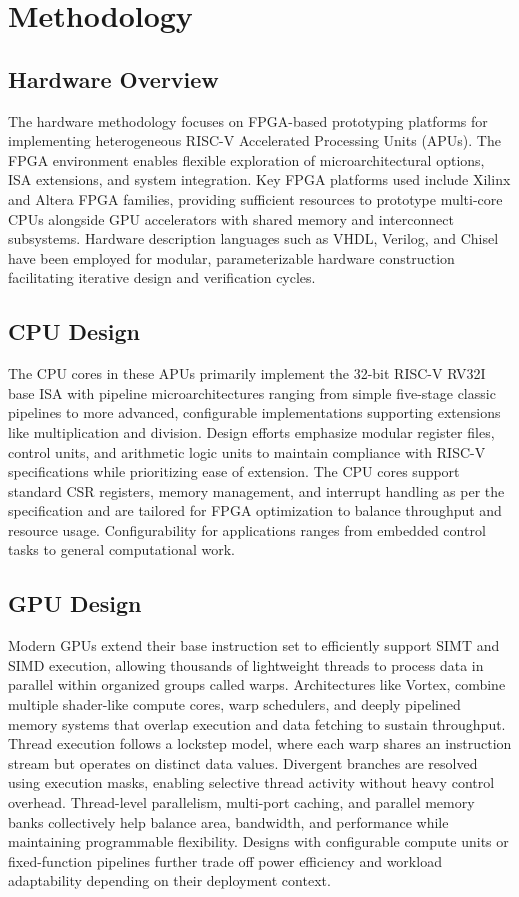 \documentclass[conference]{IEEEtran}
\begin{document}
\section{Methodology}
\subsection{Hardware Overview}
The hardware methodology focuses on FPGA-based prototyping platforms for implementing heterogeneous RISC-V Accelerated Processing Units (APUs). The FPGA environment enables flexible exploration of microarchitectural options, ISA extensions, and system integration. Key FPGA platforms used include Xilinx and Altera FPGA families, providing sufficient resources to prototype multi-core CPUs alongside GPU accelerators with shared memory and interconnect subsystems. Hardware description languages such as VHDL, Verilog, and Chisel have been employed for modular, parameterizable hardware construction facilitating iterative design and verification cycles.

\subsection{CPU Design}
The CPU cores in these APUs primarily implement the 32-bit RISC-V RV32I base ISA with pipeline microarchitectures ranging from simple five-stage classic pipelines to more advanced, configurable implementations supporting extensions like multiplication and division. Design efforts emphasize modular register files, control units, and arithmetic logic units to maintain compliance with RISC-V specifications while prioritizing ease of extension. The CPU cores support standard CSR registers, memory management, and interrupt handling as per the specification and are tailored for FPGA optimization to balance throughput and resource usage. Configurability for applications ranges from embedded control tasks to general computational work.

\subsection{GPU Design}

Modern GPUs extend their base instruction set to efficiently support SIMT and SIMD execution, allowing thousands of lightweight threads to process data in parallel within organized groups called warps. Architectures like Vortex, combine multiple shader-like compute cores, warp schedulers, and deeply pipelined memory systems that overlap execution and data fetching to sustain throughput. Thread execution follows a lockstep model, where each warp shares an instruction stream but operates on distinct data values. Divergent branches are resolved using execution masks, enabling selective thread activity without heavy control overhead. Thread-level parallelism, multi-port caching, and parallel memory banks collectively help balance area, bandwidth, and performance while maintaining programmable flexibility. Designs with configurable compute units or fixed-function pipelines further trade off power efficiency and workload adaptability depending on their deployment context.  
\end{document}
